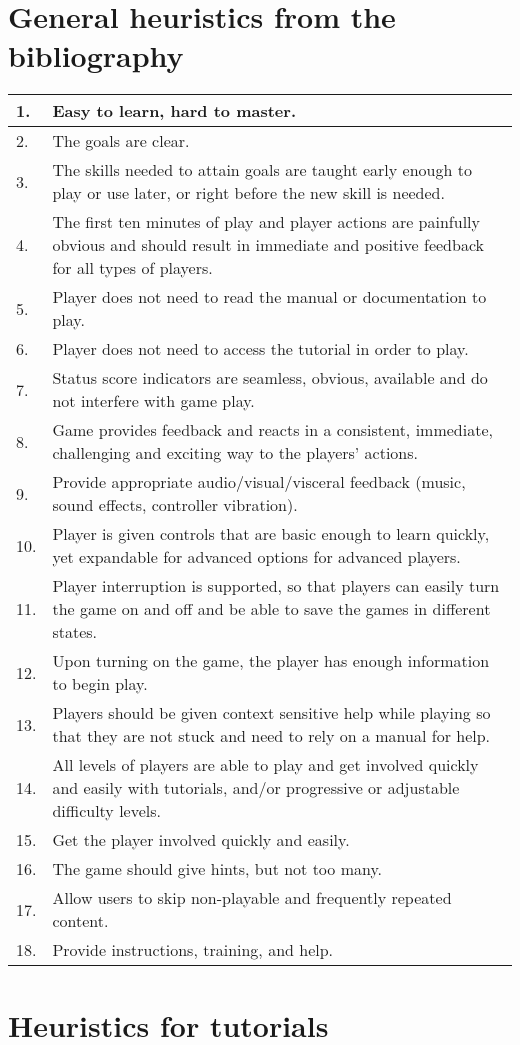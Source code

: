 \appendix
\chapter{General heuristics from the bibliography}

\begin{center}
\begin{tabularx}{\textwidth}{|l|X|}
	\hline
	1. & Easy to learn, hard to master. \\ \hline
	2. & The goals are clear. \\ \hline	
	3. & The skills needed to attain goals are taught early enough to play or use later, or right before the new skill is needed. \\ \hline
	4. & The first ten minutes of play and player actions are painfully obvious and should result in immediate and positive feedback for all types of players. \\ \hline
	5. & Player does not need to read the manual or documentation to play. \\ \hline
	6. & Player does not need to access the tutorial in order to play. \\ \hline
	7. & Status score indicators are seamless, obvious, available and do not interfere with game play. \\ \hline
	8. & Game provides feedback and reacts in a consistent, immediate, challenging and exciting way to the players’ actions. \\ \hline
	9. & Provide appropriate audio/visual/visceral feedback (music, sound effects, controller vibration). \\ \hline
	10. & Player is given controls that are basic enough to learn quickly, yet expandable for advanced options for advanced players. \\ \hline
	11. & Player interruption is supported, so that players can easily turn the game on and off and be able to save the games in different states. \\ \hline
	12. & Upon turning on the game, the player has enough information to begin play. \\ \hline
	13. & Players should be given context sensitive help while playing so that they are not stuck and need to rely on a manual for help. \\ \hline
	14. & All levels of players are able to play and get involved quickly and easily with tutorials, and/or progressive or adjustable difficulty levels. \\ \hline
	15. & Get the player involved quickly and easily. \\ \hline
	16. & The game should give hints, but not too many. \\ \hline
	17. & Allow users to skip non-playable and frequently repeated content. \\ \hline
	18. & Provide instructions, training, and help. \\ \hline
\end{tabularx}
\end{center}

\chapter{Heuristics for tutorials}
